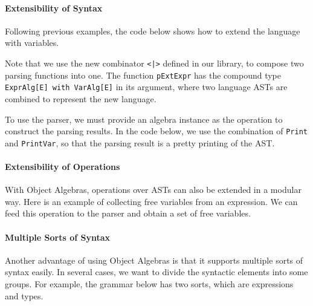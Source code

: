 

\paragraph{Extensibility of Syntax} Following previous examples, the code below shows how to extend the language with variables.

Note that we use the new combinator \lstinline{<|>} defined in our library, to compose two parsing functions into one. The function \lstinline{pExtExpr} has the compound type \lstinline{ExprAlg[E] with VarAlg[E]} in its argument, where two language ASTs are combined to represent the new language.

To use the parser, we must provide an algebra instance as the operation to construct the parsing results. In the code below, we use the combination of \lstinline{Print} and \lstinline{PrintVar}, so that the parsing result is a pretty printing of the AST.


\paragraph{Extensibility of Operations} With Object Algebras, operations over ASTs can also be extended in a modular way. Here is an example of collecting free variables from an expression. We can feed this operation to the parser and obtain a set of free variables.



\paragraph{Multiple Sorts of Syntax} Another advantage of using Object Algebras is that it supports multiple sorts of syntax easily. In several cases, we want to divide the syntactic elements into some groups. For example, the grammar below has two sorts, which are expressions and types.


